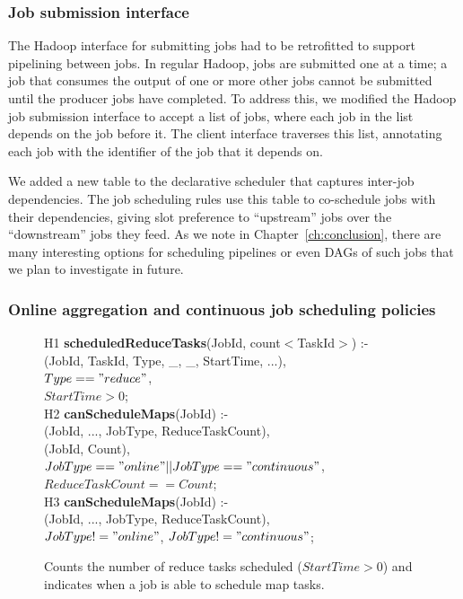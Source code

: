 \subsubsection{Job submission interface}

The Hadoop {\JT} interface for submitting jobs had to be retrofitted to support pipelining between jobs. In
regular Hadoop, jobs are submitted one at a time; a job that consumes the output
of one or more other jobs cannot be submitted until the producer jobs have
completed. To address this, we modified the Hadoop job submission interface to
accept a list of jobs, where each job in the list depends on the job before
it. The client interface traverses this list, annotating each job with the
identifier of the job that it depends on. 

We added a new table to the declarative scheduler that captures inter-job dependencies.
The job scheduling rules use this table to co-schedule jobs with their dependencies, giving 
slot preference to ``upstream'' jobs over the ``downstream'' jobs they feed.  As we note in
Chapter~\ref{ch:conclusion}, there are many interesting options for scheduling
pipelines or even DAGs of such jobs that we plan to investigate in future.


\subsubsection{Online aggregation and continuous job scheduling policies}

\begin{figure}
\ssp
\centering
\begin{boxedminipage}{\linewidth}
H1 {\bf scheduledReduceTasks}(JobId, count$<$TaskId$>$) :- \\
(JobId, TaskId, Type, \_, \_, StartTime, ...), \\
\datalogspace $Type == "reduce"$, \\
\datalogspace $StartTime > 0$; \\

H2 {\bf canScheduleMaps}(JobId) :- \\
(JobId, ..., JobType, ReduceTaskCount), \\
(JobId, Count), \\
\datalogspace $JobType == "online" || JobType == "continuous"$, \\
\datalogspace $ReduceTaskCount == Count$; \\

H3 {\bf canScheduleMaps}(JobId) :- \\
(JobId, ..., JobType, ReduceTaskCount), \\
\datalogspace $JobType != "online"$, $JobType != "continuous"$; \\

\end{boxedminipage}
\caption{\label{ch:hop:fig:schedmaps} Counts the number of reduce tasks scheduled ($StartTime > 0$) and 
indicates when a job is able to schedule map tasks.}
\end{figure}


